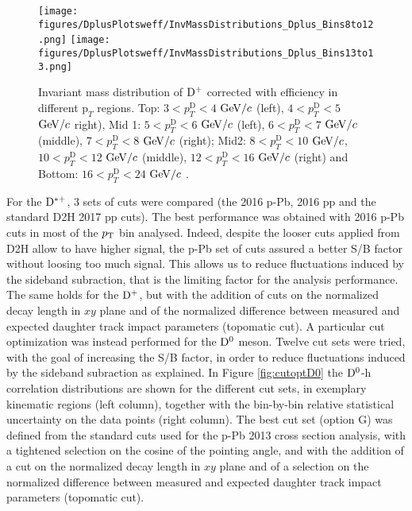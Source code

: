 \begin{figure}[h]
\centering
{\texttt{[image: figures/DplusPlotsweff/InvMassDistributions\_Dplus\_Bins8to12.png]}}
{\texttt{[image: figures/DplusPlotsweff/InvMassDistributions\_Dplus\_Bins13to13.png]}}
\caption{Invariant mass distribution of ${\rm D^+}$ corrected with efficiency in different $\text{p}_T$ regions. Top: $3< p_{T}^{\text{D}}< 4$ $\mathrm{GeV}/c$ (left), $4< p_{T}^{\text{D}}< 5$ $\mathrm{GeV}/c$ right), Mid 1: $5< p_{T}^{\text{D}}< 6$ $\mathrm{GeV}/c$ (left), $6 < p_{T}^{\text{D}} < 7$ $\mathrm{GeV}/c$ (middle), $7< p_{T}^{\text{D}}< 8$ $\mathrm{GeV}/c$ (right); Mid2: $8< p_{T}^{\text{D}}< 10$ $\mathrm{GeV}/c$, $10< p_{T}^{\text{D}}< 12$ $\mathrm{GeV}/c$  (middle), $12 < p_{T}^{\text{D}}< 16$ $\mathrm{GeV}/c$  (right) and Bottom: $16<p_{T}^{\text{D}}< 24$ $\mathrm{GeV}/c$ .}
\label{fig:InvMassDp}
\end{figure}

For the ${\rm D^{*+}}$, 3 sets of cuts were compared (the 2016 p-Pb, 2016 pp and the standard D2H 2017 pp cuts). The best performance was obtained with 2016 p-Pb cuts in most of the $p_{\rm T}$ bin analysed. Indeed, despite the looser cuts applied from D2H allow to have higher signal, the p-Pb set of cuts assured a better S/B factor without loosing too much signal. This allows us to reduce fluctuations induced by the sideband subraction, that is the limiting factor for the analysis performance.
The same holds for the ${\rm D^+}$, but with the addition of cuts on the normalized decay length in $xy$ plane and of the normalized difference between measured and expected daughter track impact parameters (topomatic cut).
A particular cut optimization was instead performed for the ${\rm D^0}$ meson. Twelve cut sets were tried, with the goal of increasing the S/B factor, in order to reduce fluctuations induced by the sideband subraction as explained.
In Figure \ref{fig:cutoptD0} the ${\rm D^0}$-h correlation distributions are shown for the different cut sets, in exemplary kinematic regions (left column), together with the bin-by-bin relative statistical uncertainty on the data points (right column). The best cut set (option G) was defined from the standard cuts used for the p-Pb 2013 cross section analysis, with a tightened selection on the cosine of the pointing angle, and with the addition of a cut on the normalized decay length in $xy$ plane and of a selection on the normalized difference between measured and expected daughter track impact parameters (topomatic cut).

